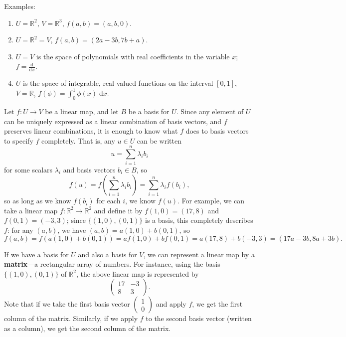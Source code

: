 \documentclass{article}
\newcommand{\deriv}[3][]{\frac{\mathrm{d}^{#1}#2}{\mathrm{d}#3^{#1}}}
\newcommand{\diff}{\;\mathrm{d}}
\begin{document}
Examples:

\begin{enumerate}
	\item $U=\mathbb{R}^2$, $V=\mathbb{R}^3$, $f(a,b)=(a,b,0)$.
	\item $U=\mathbb{R}^2=V$, $f(a,b)=(2a-3b,7b+a)$.
	\item $U=V$ is the space of polynomials with real coefficients in the variable $x$; $f=\deriv{}{x}$.
	\item $U$ is the space of integrable, real-valued functions on the interval $[0,1]$, $V=\mathbb{R}$, $f(\phi)=\int_0^1 \phi(x)\diff x$.
\end{enumerate}

Let $f:U\to V$ be a linear map, and let $B$ be a basis for $U$. Since any element of $U$ can be uniquely expressed as a linear combination of basis vectors, and $f$ preserves linear combinations, it is enough to know what $f$ does to basis vectors to specify $f$ completely. That is, any $u\in U$ can be written
\[u=\sum_{i=1}^n \lambda_i b_i\]
for some scalars $\lambda_i$ and basis vectors $b_i\in B$, so
\[f(u)=f\left(\sum_{i=1}^n \lambda_i b_i\right) = \sum_{i=1}^n \lambda_i f(b_i),\]
so as long as we know $f(b_i)$ for each $i$, we know $f(u)$. For example, we can take a linear map $f:\mathbb{R}^2\to\mathbb{R}^2$ and define it by $f(1,0)=(17,8)$ and $f(0,1)=(-3,3)$; since $\{(1,0),(0,1)\}$ is a basis, this completely describes $f$: for any $(a,b)$, we have $(a,b)=a(1,0)+b(0,1)$, so
\[f(a,b)=f(a(1,0)+b(0,1))=af(1,0)+bf(0,1)=a(17,8)+b(-3,3)=(17a-3b,8a+3b).\]

If we have a basis for $U$ and also a basis for $V$, we can represent a linear map by a \textbf{matrix}---a rectangular array of numbers. For instance, using the basis $\{(1,0),(0,1)\}$ of $\mathbb{R}^2$, the above linear map is represented by
\[\left(\begin{array}{cc} 17&-3\\ 8& 3\end{array}\right).\]
Note that if we take the first basis vector $\left(\begin{array}{c}1\\0\end{array}\right)$ and apply $f$, we get the first column of the matrix. Similarly, if we apply $f$ to the second basis vector (written as a column), we get the second column of the matrix.
\end{document}
